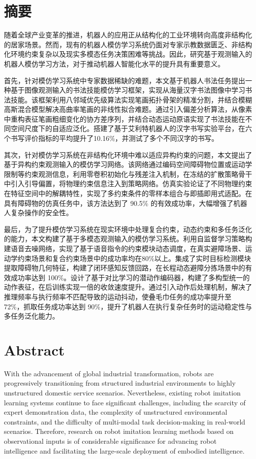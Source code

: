 \chapter{摘\texorpdfstring{\quad}{}要}

随着全球产业变革的推进，机器人的应用正从结构化的工业环境转向高度非结构化的居家场景。然而，现有的机器人模仿学习系统仍面对专家示教数据匮乏、非结构化环境约束复杂以及现实多模态任务决策困难等挑战。因此，研究基于观测输入的机器人模仿学习方法，对于推动机器人智能化水平的提升具有重要意义。

首先，针对模仿学习系统中专家数据稀缺的难题，本文基于机器人书法任务提出一种基于图像观测输入的书法技能模仿学习框架，实现从海量汉字书法图像中学习书法技能。该框架利用八邻域优先级算法实现笔画拓扑骨架的精准分割，并结合模糊高斯混合模型解决高曲率笔画的非线性拟合难题。通过引入偏差分析算法，从像素中重构表征笔画粗细变化的协方差序列，并结合动态运动原语实现了书法技能在不同空间尺度下的自适应泛化。搭建了基于艾利特机器人的汉字书写实验平台，在六个书写评价指标的平均提升了10.16\%，并测试了多个不同汉字的书写。

其次，针对模仿学习系统在非结构化环境中难以适应异构约束的问题，本文提出了基于异构约束观测输入的模仿学习网络。该网络通过编码空间障碍物位置或运动学限制等约束观测信息，利用零卷积初始化与残差注入机制，在冻结的扩散策略骨干中引入引导偏置，将物理约束信息注入到策略网络。仿真实验论证了不同物理约束在特征空间中的解耦特性，实现了多约束条件的零样本组合与即插即用式适配。在具有障碍物的仿真任务中，该方法达到了 90.5\% 的有效成功率，大幅增强了机器人复杂操作的安全性。

最后，为了提升模仿学习系统在现实环境中处理复合约束，动态约束和多任务泛化的能力，本文构建了基于多模态观测输入的模仿学习系统。利用自监督学习策略构建语音去噪网络，实现了基于语音指令的约束模块动态调度，在真实避障场景、运动学约束场景和复合约束场景中的成功率均在80\%以上。集成了实时目标检测模块提取障碍物几何特征，构建了闭环感知反馈回路，在长程动态避障分拣场景中的有效成功率达到 100\%。设计了基于对比学习的潜动作编码器，构建了多构型统一的动作表征，在后训练实现一倍的收敛速度提升。通过引入动作后处理机制，解决了推理频率与执行频率不匹配导致的运动抖动，使叠毛巾任务的成功率提升至 72\%，抓取任务成功率达到 90\%，提升了机器人在执行复杂任务时的运动稳定性与多任务泛化能力。


\chapter{Abstract}
With the advancement of global industrial transformation, robots are progressively transitioning from structured industrial environments to highly unstructured domestic service scenarios. Nevertheless, existing robot imitation learning systems continue to face significant challenges, including the scarcity of expert demonstration data, the complexity of unstructured environmental constraints, and the difficulty of multi-modal task decision-making in real-world scenarios. Therefore, research on robot imitation learning methods based on observational inputs is of considerable significance for advancing robot intelligence and facilitating the large-scale deployment of embodied intelligence.

